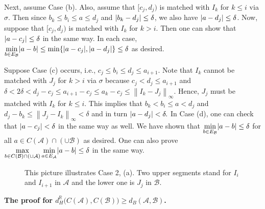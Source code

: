 \documentclass[a4paper,12pt]{article}
\DeclarePairedDelimiter{\abs}{\lvert}{\rvert}
\newcommand{\norm}[1]{\left\lVert#1\right\rVert}
\begin{document}
Next, assume Case (b). Also, assume that $[c_j,d_j)$ is matched with $I_k$ for $k\leq i$ via $\sigma$. Then since $b_k\leq b_i\leq a \leq d_j$ and $\abs{b_k-d_j}\leq \delta$, we also have $\abs{a-d_j}\leq \delta$. Now, suppose that  $[c_j,d_j)$ is matched with $I_k$ for $k> i$. Then one can show that $\abs{a-c_j}\leq \delta$ in the same way. In each case, $\displaystyle \min_{b\in E_{\mathcal{B}}}\abs{a-b}\leq \min\{\abs{a-c_j}, \abs{a-d_j}\} \leq \delta$ as desired. \par

Suppose Case (c) occurs, i.e., $c_j \leq b_i \leq d_j \leq a_{i+1}$. Note that $I_k$ cannot be matched with $J_j$ for $k>i$ via $\sigma$ because $c_j<d_j\leq a_{i+1}$ and $\delta< 2\delta < d_j-c_j \leq a_{i+1}-c_j \leq a_k-c_j \leq \norm{I_k-J_j}_{\infty}$. Hence, $J_j$ must be matched with $I_k$ for $k\leq i$.  This implies that $b_k<b_i\leq a < d_j$ and $d_j-b_k\leq \norm{J_j-I_k}_\infty<\delta$ and in turn $\abs{a-d_j}<\delta.$  In Case (d), one can check that $\abs{a-c_j}<\delta$ in the same way as well. We have shown that $\displaystyle \min_{b\in E_{\mathcal{B}}}\abs{a-b}\leq \delta$ for all $a\in C(\mathcal{A})\cap (\cup \mathcal{B})$ as desired. One can also prove $\displaystyle \max_{b\in C(\mathcal{B})\cap (\cup \mathcal{A})}\min_{a\in E_\mathcal{A}}\abs{a-b}\leq \delta$ in the same way.\endproof

\begin{figure}[b] 
\caption{This picture illustrates Case 2, (a). Two upper segments stand for $I_i$ and $I_{i+1}$ in $\mathcal{A}$ and the lower one is $J_j$ in $\mathcal{B}$.}
\end{figure}

\vspace{5mm}

\textbf{The proof for $d_{H}^\mathbb{R}\big(C(\mathcal{A}) ,C(\mathcal{B})\big)\geq d_B(\mathcal{A}, \mathcal{B})$.}\\
\end{document}
